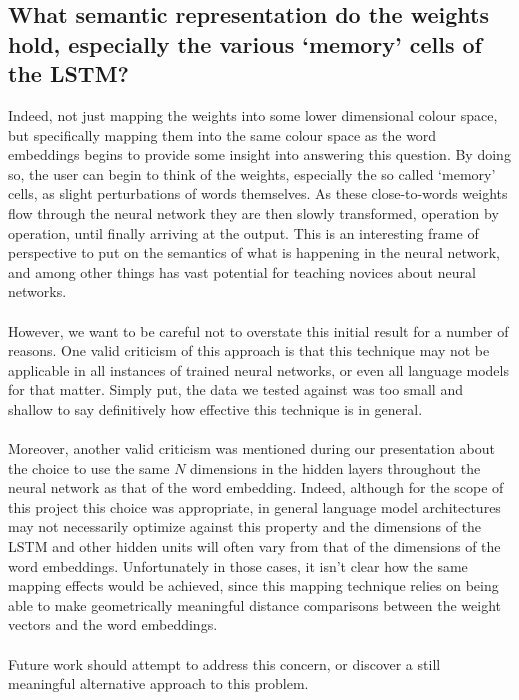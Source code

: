 \documentclass[journal]{vgtc}                %
\begin{document}
\subsection{What semantic representation do the weights hold, especially the various `memory' cells of the LSTM?}
Indeed, not just mapping the weights into some lower dimensional colour space, but specifically mapping them into the same colour space as the word embeddings begins to provide some insight into answering this question.
By doing so, the user can begin to think of the weights, especially the so called `memory' cells, as slight perturbations of words themselves.
As these close-to-words weights flow through the neural network they are then slowly transformed, operation by operation, until finally arriving at the output.
This is an interesting frame of perspective to put on the semantics of what is happening in the neural network, and among other things has vast potential for teaching novices about neural networks.
\\
\\
However, we want to be careful not to overstate this initial result for a number of reasons.
One valid criticism of this approach is that this technique may not be applicable in all instances of trained neural networks, or even all language models for that matter.
Simply put, the data we tested against was too small and shallow to say definitively how effective this technique is in general.
\\
\\
Moreover, another valid criticism was mentioned during our presentation about the choice to use the same $N$ dimensions in the hidden layers throughout the neural network as that of the word embedding.
Indeed, although for the scope of this project this choice was appropriate, in general language model architectures may not necessarily optimize against this property and the dimensions of the LSTM and other hidden units will often vary from that of the dimensions of the word embeddings.
Unfortunately in those cases, it isn't clear how the same mapping effects would be achieved, since this mapping technique relies on being able to make geometrically meaningful distance comparisons between the weight vectors and the word embeddings.
\\
\\
Future work should attempt to address this concern, or discover a still meaningful alternative approach to this problem.
\end{document}
